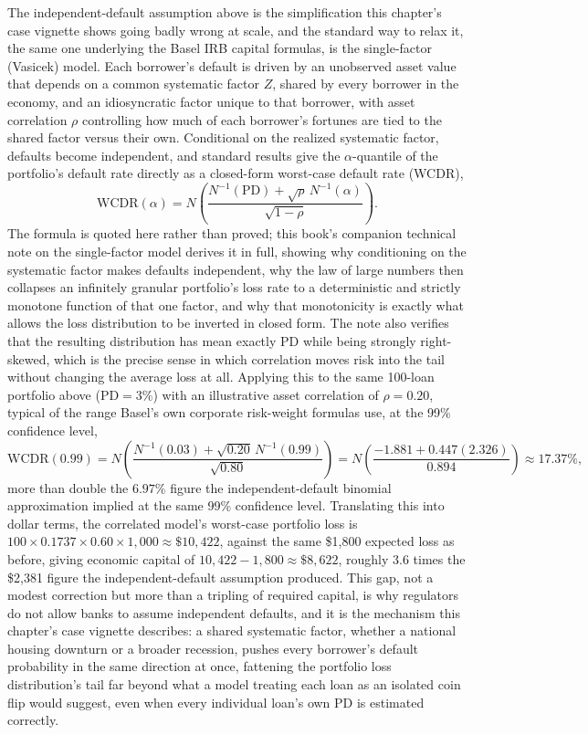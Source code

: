 \documentclass[../ai_in_finance]{subfiles}
\begin{document}
The independent-default assumption above is the simplification this chapter's case vignette shows going badly wrong at scale, and the standard way to relax it, the same one underlying the Basel IRB capital formulas, is the single-factor (Vasicek) model. Each borrower's default is driven by an unobserved asset value that depends on a common systematic factor $Z$, shared by every borrower in the economy, and an idiosyncratic factor unique to that borrower, with asset correlation $\rho$ controlling how much of each borrower's fortunes are tied to the shared factor versus their own. Conditional on the realized systematic factor, defaults become independent, and standard results give the $\alpha$-quantile of the portfolio's default rate directly as a closed-form worst-case default rate (WCDR),
\begin{equation*}
\text{WCDR}(\alpha) = N\!\left(\frac{N^{-1}(\text{PD}) + \sqrt{\rho}\,N^{-1}(\alpha)}{\sqrt{1-\rho}}\right).
\end{equation*}
The formula is quoted here rather than proved; this book's companion technical note on the single-factor model derives it in full, showing why conditioning on the systematic factor makes defaults independent, why the law of large numbers then collapses an infinitely granular portfolio's loss rate to a deterministic and strictly monotone function of that one factor, and why that monotonicity is exactly what allows the loss distribution to be inverted in closed form. The note also verifies that the resulting distribution has mean exactly $\text{PD}$ while being strongly right-skewed, which is the precise sense in which correlation moves risk into the tail without changing the average loss at all.
Applying this to the same 100-loan portfolio above ($\text{PD}=3\%$) with an illustrative asset correlation of $\rho=0.20$, typical of the range Basel's own corporate risk-weight formulas use, at the 99\% confidence level,
\begin{equation*}
\text{WCDR}(0.99) = N\!\left(\frac{N^{-1}(0.03) + \sqrt{0.20}\,N^{-1}(0.99)}{\sqrt{0.80}}\right) = N\!\left(\frac{-1.881 + 0.447(2.326)}{0.894}\right) \approx 17.37\%,
\end{equation*}
more than double the $6.97\%$ figure the independent-default binomial approximation implied at the same 99\% confidence level. Translating this into dollar terms, the correlated model's worst-case portfolio loss is $100 \times 0.1737 \times 0.60 \times 1{,}000 \approx \$10{,}422$, against the same \$1,800 expected loss as before, giving economic capital of $10{,}422 - 1{,}800 \approx \$8{,}622$, roughly $3.6$ times the \$2,381 figure the independent-default assumption produced.
This gap, not a modest correction but more than a tripling of required capital, is why regulators do not allow banks to assume independent defaults, and it is the mechanism this chapter's case vignette describes: a shared systematic factor, whether a national housing downturn or a broader recession, pushes every borrower's default probability in the same direction at once, fattening the portfolio loss distribution's tail far beyond what a model treating each loan as an isolated coin flip would suggest, even when every individual loan's own PD is estimated correctly.
\end{document}
